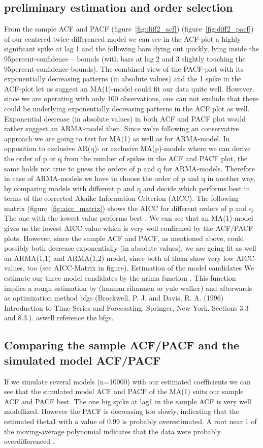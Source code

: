 \documentclass[11pt,a4paper]{article}
\begin{document}
\subsection{preliminary estimation and order selection}
From the sample ACF and PACF (figure~\ref{fig:diff2_acf}) (figure~\ref{fig:diff2_pacf}) of our centered twice-differenced model we can see in the ACF-plot a highly significant spike at lag 1 and the following bars dying out quickly, lying inside the 95percent-confidence – bounds (with bars at lag 2 and 3 slightly touching the 95percent-confidence-bounds). The combined view of the PACF-plot with its exponentially decreasing patterns (in absolute values) and the 1 spike in the ACF-plot let us suggest an MA(1)-model could fit our data quite well.
However, since we are operating with only 100 observations, one can not exclude that there could be underlying exponentially decreasing patterns in the ACF plot as well. Exponential decrease (in absolute values) in both ACF and PACF plot would rather suggest an ARMA-model then. Since we’re following an conservative approach we are going to test for MA(1) as well as for ARMA-model. In opposition to exclusive AR(q)- or exclusive MA(p)-models where we can derive the order of p or q from the number of spikes in the ACF and PACF plot, the same holds not true to guess the orders of p and q for ARMA-models. Therefore in case of ARMA-models we have to choose the order of p and q in another way, by comparing models with different p and q and decide which performs best in terms of the corrected Akaike Information Criterion (AICC).
The following matrix (figure~\ref{fig:aicc_matrix}) shows the AICC for different orders of p and q. The one with the lowest value performs best \citep{aic86}. We can see that an MA(1)-model gives us the lowest AICC-value which is very well confirmed by the ACF/PACF plots. However, since the sample ACF and PACF, as mentioned above, could possibly both decrease exponentially (in absolute values), we are going fit as well an ARMA(1,1) and ARMA(1,2) model, since both of them show very low AICC-values, too (see AICC-Matrix in figure).
Estimation of the model candidates
We estimate our three model candidates by the arima function . This function implies a rough estimation by (hannan rihannen or yule walker) and afterwards as optimization method bfgs (Brockwell, P. J. and Davis, R. A. (1996) Introduction to Time Series and Forecasting. Springer, New York. Sections 3.3 and 8.3.).  aswell reference the bfgs.
\subsection{Comparing the sample ACF/PACF and the simulated model ACF/PACF}
If we simulate several models (n=10000) with our estimated coefficients we can see that the simulated model ACF and PACF of the MA(1) suits our sample ACF and PACF best. The one big spike at lag1 in the sample ACF is very well modellized. However the PACF is decreasing too slowly, indicating that the estimated theta1 with a value of 0.99 is probably overestimated. A root near 1 of the moving-average polynomial indicates that the data were probably overdifferenced \citep[p.~193]{bd02}.
\end{document}
